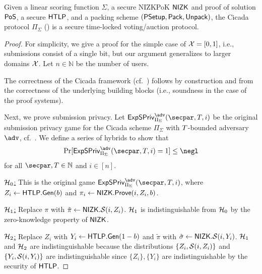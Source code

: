\begin{theorem}\label{thm:cicada}
    Given a linear scoring function $\Sigma$, a secure NIZKPoK $\mathsf{NIZK}$ and proof of solution ${\sf PoS}$, a secure $\mathsf{HTLP}$, and a packing scheme $({\sf PSetup},\allowbreak \mathsf{Pack},\allowbreak \mathsf{Unpack})$, the Cicada protocol $\Pi_\Sigma$ () is a secure time-locked voting/auction protocol. %
\end{theorem}

\begin{proof}
\def\Exp{\ensuremath{\mathsf{ExpSPriv}_{\Pi_\Sigma}^\adv(\secpar,\Ttime,i)}}
    For simplicity, we give a proof for the simple case of $\mathcal{X}=[0,1]$, i.e., submissions consist of a single bit, but our argument generalizes to larger domains $\mathcal{X}$. Let $n \in \mathbb{N}$ be the number of users.

    The correctness of the Cicada framework (cf.~) follows by construction and from the correctness of the underlying building blocks (i.e., soundness in the case of the proof systems).
    
    Next, we prove submission privacy.
    Let $\Exp$ be the original submission privacy game for the Cicada scheme $\Pi_\Sigma$ with $T$-bounded adversary $\adv$, cf.~. We define a series of hybrids to show that 
    \[ 
        \Pr[\Exp = 1] \leq \negl 
    \]
    for all $\secpar,\Ttime \in \mathbb{N}$ and $i\in[n]$.
    
    \underline{$\mathcal{H}_0$:} This is the original game $\Exp$, where $Z_i \gets \mathsf{HTLP}.{\sf Gen}(b)$ and $\pi_i \gets \mathsf{NIZK}.\mathsf{Prove}(i, Z_i, b)$.
    
    \underline{$\mathcal{H}_1$:} Replace $\pi$ with $\tilde{\pi} \gets {\sf NIZK}.\mathcal{S}(i, Z_i)$. $\mathcal{H}_1$ is indistinguishable from $\mathcal{H}_0$ by the zero-knowledge property of $\sf NIZK$.

    \underline{$\mathcal{H}_2$:} Replace $Z_i$ with $Y_i \gets \mathsf{HTLP}.{\sf Gen}(1-b)$ and $\tilde{\pi}$ with $\tilde{\sigma} \gets {\sf NIZK}.\mathcal{S}(i, Y_i)$. $\mathcal{H}_1$ and $\mathcal{H}_2$ are indistinguishable because the distributions $\{Z_i, \mathcal{S}(i, Z_i)\}$ and $\{Y_i, \mathcal{S}(i, Y_i)\}$ are indistinguishable since $\{Z_i\}, \{Y_i\}$ are indistinguishable by the security of $\mathsf{HTLP}$.

    

\end{proof}
